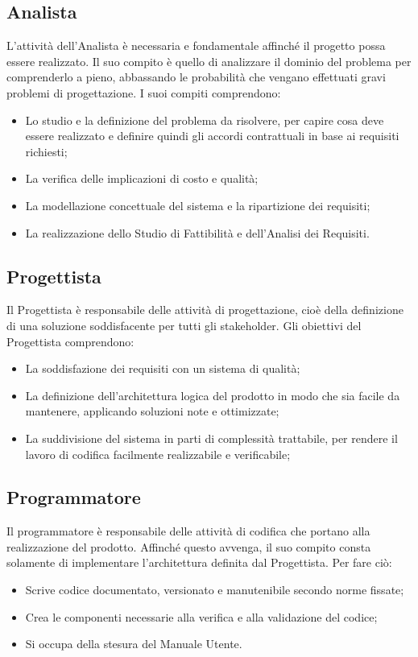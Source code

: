 \documentclass[NormeDiProgetto.tex]{subfiles}
\begin{document}
	\subsection{Analista}
	L'attività dell'Analista è necessaria e fondamentale affinché il progetto possa essere realizzato. Il suo compito è quello di analizzare il dominio del problema per comprenderlo a pieno, abbassando le probabilità che vengano effettuati gravi problemi di progettazione. I suoi compiti comprendono:
	\begin{itemize}
		\item Lo studio e la definizione del problema da risolvere, per capire cosa deve essere realizzato e definire quindi gli accordi contrattuali in base ai requisiti richiesti;
		\item La verifica delle implicazioni di costo e qualità;
		\item La modellazione concettuale del sistema e la ripartizione dei requisiti;
		\item La realizzazione dello Studio di Fattibilità e dell'Analisi dei Requisiti.
	\end{itemize}
	\subsection{Progettista}
	Il Progettista è responsabile delle attività di progettazione, cioè della definizione di una soluzione soddisfacente per tutti gli stakeholder. Gli obiettivi del Progettista comprendono:
	\begin{itemize}
		\item La soddisfazione dei requisiti con un sistema di qualità;
		\item La definizione dell'architettura logica del prodotto in modo che sia facile da mantenere, applicando soluzioni note e ottimizzate;
		\item La suddivisione del sistema in parti di complessità trattabile, per rendere il lavoro di codifica facilmente realizzabile e verificabile;
	\end{itemize} 

	\subsection{Programmatore}
	Il programmatore è responsabile delle attività di codifica che portano alla realizzazione del prodotto. Affinché questo avvenga, il suo compito consta solamente di implementare l'architettura definita dal Progettista. Per fare ciò:
	\begin{itemize}
		\item Scrive codice documentato, versionato e manutenibile secondo norme fissate;
		\item Crea le componenti necessarie alla verifica e alla validazione del codice;
		\item Si occupa della stesura del Manuale Utente.
	\end{itemize}
\end{document}
